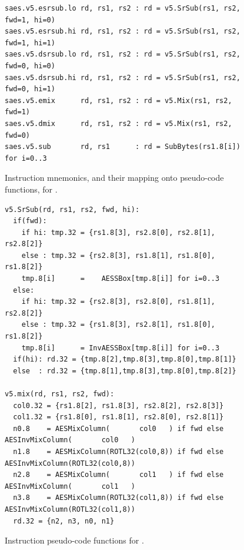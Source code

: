 
\begin{figure}[!h]
\begin{lstlisting}[language=pseudo,style=block]
saes.v5.esrsub.lo rd, rs1, rs2 : rd = v5.SrSub(rs1, rs2, fwd=1, hi=0)
saes.v5.esrsub.hi rd, rs1, rs2 : rd = v5.SrSub(rs1, rs2, fwd=1, hi=1)
saes.v5.dsrsub.lo rd, rs1, rs2 : rd = v5.SrSub(rs1, rs2, fwd=0, hi=0)
saes.v5.dsrsub.hi rd, rs1, rs2 : rd = v5.SrSub(rs1, rs2, fwd=0, hi=1)
saes.v5.emix      rd, rs1, rs2 : rd = v5.Mix(rs1, rs2, fwd=1)
saes.v5.dmix      rd, rs1, rs2 : rd = v5.Mix(rs1, rs2, fwd=0)
saes.v5.sub       rd, rs1      : rd = SubBytes(rs1.8[i])         for i=0..3
\end{lstlisting}
\caption{
  Instruction mnemonics, and their mapping onto pseudo-code functions, for .
}
\label{fig:v5:mnemonics}
\end{figure}

\begin{figure}[!h]
\begin{lstlisting}[language=pseudo,style=block]
v5.SrSub(rd, rs1, rs2, fwd, hi):
  if(fwd):
    if hi: tmp.32 = {rs1.8[3], rs2.8[0], rs2.8[1], rs2.8[2]}
    else : tmp.32 = {rs2.8[3], rs1.8[1], rs1.8[0], rs1.8[2]}
    tmp.8[i]      =    AESSBox[tmp.8[i]] for i=0..3
  else:
    if hi: tmp.32 = {rs2.8[3], rs2.8[0], rs1.8[1], rs2.8[2]}
    else : tmp.32 = {rs1.8[3], rs2.8[1], rs1.8[0], rs1.8[2]}
    tmp.8[i]      = InvAESSBox[tmp.8[i]] for i=0..3
  if(hi): rd.32 = {tmp.8[2],tmp.8[3],tmp.8[0],tmp.8[1]}
  else  : rd.32 = {tmp.8[1],tmp.8[3],tmp.8[0],tmp.8[2]}

v5.mix(rd, rs1, rs2, fwd):
  col0.32 = {rs1.8[2], rs1.8[3], rs2.8[2], rs2.8[3]}
  col1.32 = {rs1.8[0], rs1.8[1], rs2.8[0], rs2.8[1]}
  n0.8    = AESMixColumn(       col0   ) if fwd else AESInvMixColumn(       col0   )
  n1.8    = AESMixColumn(ROTL32(col0,8)) if fwd else AESInvMixColumn(ROTL32(col0,8))
  n2.8    = AESMixColumn(       col1   ) if fwd else AESInvMixColumn(       col1   )
  n3.8    = AESMixColumn(ROTL32(col1,8)) if fwd else AESInvMixColumn(ROTL32(col1,8))
  rd.32 = {n2, n3, n0, n1}
\end{lstlisting}
\caption{
  Instruction pseudo-code functions for .
}
\label{fig:v5:pseudo}
\end{figure}

